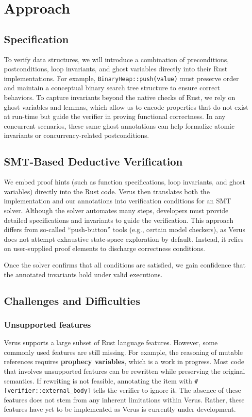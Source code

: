 \documentclass[conference]{IEEEtran}
\begin{document}
\section{Approach}

\subsection{Specification}
To verify data structures, we will introduce a combination of preconditions, postconditions, loop invariants, and ghost variables directly into their Rust implementations. For example, \texttt{BinaryHeap::push(value)} must preserve order and maintain a conceptual binary search tree structure to ensure correct behaviors. To capture invariants beyond the native checks of Rust, we rely on ghost variables and lemmas, which allow us to encode properties that do not exist at run-time but guide the verifier in proving functional correctness. In any concurrent scenarios, these same ghost annotations can help formalize atomic invariants or concurrency-related postconditions.

\subsection{SMT-Based Deductive Verification}

We embed proof hints (such as function specifications, loop invariants, and ghost variables) directly into the Rust code. Verus then translates both the implementation and our annotations into verification conditions for an SMT solver. Although the solver automates many steps, developers must provide detailed specifications and invariants to guide the verification. This approach differs from so-called “push-button” tools (e.g., certain model checkers), as Verus does not attempt exhaustive state-space exploration by default. Instead, it relies on user-supplied proof elements to discharge correctness conditions. 

Once the solver confirms that all conditions are satisfied, we gain confidence that the annotated invariants hold under valid executions.

\subsection{Challenges and Difficulties}
\subsubsection{Unsupported features} 
Verus supports a large subset of Rust language features. However, some commonly used features are still missing. For example, the reasoning of mutable references requires \textbf{prophecy variables}\cite{Prophecy}, which is a work in progress. Most code that involves unsupported features can be rewritten while preserving the original semantics. If rewriting is not feasible, annotating the item with \texttt{\#[verifier::external\_body]} tells the verifier to ignore it. The absence of these features does not stem from any inherent limitations within Verus. Rather, these features have yet to be implemented as Verus is currently under development.  
\end{document}

